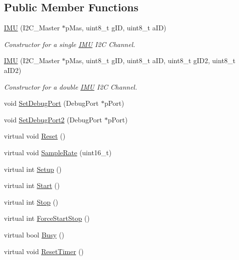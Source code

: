 \subsection*{Public Member Functions}
\begin{DoxyCompactItemize}
\item 
\hyperlink{class_i_m_u_aa628daa06d0e29e4aa84bb8336649134}{IMU} (I2C\_\-Master $\ast$pMas, uint8\_\-t gID, uint8\_\-t aID)
\begin{DoxyCompactList}\small\item\em Constructor for a single \hyperlink{class_i_m_u}{IMU} I2C Channel. \item\end{DoxyCompactList}\item 
\hyperlink{class_i_m_u_ac3b25bbd72ae020b61012fd4ebf8a188}{IMU} (I2C\_\-Master $\ast$pMas, uint8\_\-t gID, uint8\_\-t aID, uint8\_\-t gID2, uint8\_\-t aID2)
\begin{DoxyCompactList}\small\item\em Constructor for a double \hyperlink{class_i_m_u}{IMU} I2C Channel. \item\end{DoxyCompactList}\item 
void \hyperlink{class_i_m_u_afedf46bdad68cb4002af8bf46530d265}{SetDebugPort} (DebugPort $\ast$pPort)
\item 
void \hyperlink{class_i_m_u_a6f86c79e66c4262093c2d65fe3fee45c}{SetDebugPort2} (DebugPort $\ast$pPort)
\item 
virtual void \hyperlink{class_i_m_u_a13191357ff93d02f6cc7aa7e55b13d67}{Reset} ()
\item 
virtual void \hyperlink{class_i_m_u_a7705d9d642b093a670e78534c9b2d3db}{SampleRate} (uint16\_\-t)
\item 
virtual int \hyperlink{class_i_m_u_a290737d42de965c15c8327edfc516ffd}{Setup} ()
\item 
virtual int \hyperlink{class_i_m_u_a7c03f7a423240538756a62441b298d01}{Start} ()
\item 
virtual int \hyperlink{class_i_m_u_af0841bed4167f7a4eb12c40d7b8e615e}{Stop} ()
\item 
virtual int \hyperlink{class_i_m_u_a004d2bb9e6155f45edc9e46bce730644}{ForceStartStop} ()
\item 
virtual bool \hyperlink{class_i_m_u_ade0f7e6be2eda441bfaa2cb372fec55a}{Busy} ()
\item 
virtual void \hyperlink{class_i_m_u_a187dc9de30f97f5154e0ff904eb6ee1a}{ResetTimer} ()
\item 

\end{DoxyCompactItemize}
